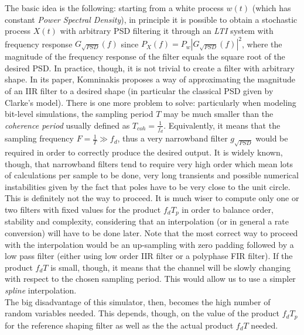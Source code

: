The basic idea is the following: starting from a white process $w(t)$ (which has constant \textit{Power Spectral Density}), in principle it is possible to obtain a stochastic process $X(t)$ with arbitrary PSD filtering it through an \textit{LTI} system with frequency response $G_{\sqrt{PSD}}(f)$ since $P_X(f) = P_w |G_{\sqrt{PSD}}(f)|^2$, where the magnitude of the frequency response of the filter equals the square root of the desired PSD. In practice, though, it is not trivial to create a filter with arbitrary shape. In its paper, Komninakis proposes a way of approximating the magnitude of an IIR filter to a desired shape (in particular the classical PSD given by Clarke's model). There is one more problem to solve: particularly when modeling bit-level simulations, the sampling period $T$ may be much smaller than the \textit{coherence period} usually defined as $T_{coh}=\frac{1}{f_d}$. Equivalently, it means that the sampling frequency $F = \frac{1}{T} \gg f_d$, thus a very narrowband filter $g_{\sqrt{PSD}}$ would be required in order to correctly produce the desired output. It is widely known, though, that narrowband filters tend to require very high order which mean lots of calculations per sample to be done, very long transients and possible numerical instabilities given by the fact that poles have to be very close to the unit circle. This is definitely not the way to proceed. It is much wiser to compute only one or two filters with fixed values for the product $f_dT_p$ in order to balance order, stability and complexity, considering that an interpolation (or in general a rate conversion) will have to be done later. Note that the most correct way to proceed with the interpolation would be an up-sampling with zero padding followed by a low pass filter (either using low order IIR filter or a polyphase FIR filter). If the product $f_dT$ is small, though, it means that the channel will be slowly changing with respect to the chosen sampling period. This would allow us to use a simpler \textit{spline} interpolation.\\
The big disadvantage of this simulator, then, becomes the high number of random variables needed. This depends, though, on the value of the product $f_dT_p$ for the reference shaping filter as well as the the actual product $f_dT$ needed.